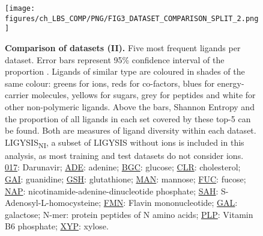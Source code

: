\begin{figure}[ht!]
    \centering
    \texttt{[image: figures/ch\_LBS\_COMP/PNG/FIG3\_DATASET\_COMPARISON\_SPLIT\_2.png]}
    \caption[Comparison of datasets (II)]{\textbf{Comparison of datasets (II).} Five most frequent ligands per dataset. Error bars represent 95\% confidence interval of the proportion \cite{WILSON_197_PROP_CI}. Ligands of similar type are coloured in shades of the same colour: greens for ions, reds for co-factors, blues for energy-carrier molecules, yellows for sugars, grey for peptides and white for other non-polymeric ligands. Above the bars, Shannon Entropy and the proportion of all ligands in each set covered by these top-5 can be found. Both are measures of ligand diversity within each dataset. LIGYSIS\textsubscript{NI}, a subset of LIGYSIS without ions is included in this analysis, as most training and test datasets do not consider ions. \href{https://www.ebi.ac.uk/pdbe-srv/pdbechem/chemicalCompound/show/017}{017}: Darunavir; \href{https://www.ebi.ac.uk/pdbe-srv/pdbechem/chemicalCompound/show/ADE}{ADE}: adenine; \href{https://www.ebi.ac.uk/pdbe-srv/pdbechem/chemicalCompound/show/BGC}{BGC}: glucose; \href{https://www.ebi.ac.uk/pdbe-srv/pdbechem/chemicalCompound/show/CLR}{CLR}: cholesterol; \href{https://www.ebi.ac.uk/pdbe-srv/pdbechem/chemicalCompound/show/GAI}{GAI}: guanidine; \href{https://www.ebi.ac.uk/pdbe-srv/pdbechem/chemicalCompound/show/GSH}{GSH}: glutathione; \href{https://www.ebi.ac.uk/pdbe-srv/pdbechem/chemicalCompound/show/MAN}{MAN}: mannose; \href{https://www.ebi.ac.uk/pdbe-srv/pdbechem/chemicalCompound/show/FUC}{FUC}: fucose; \href{https://www.ebi.ac.uk/pdbe-srv/pdbechem/chemicalCompound/show/NAP}{NAP}: nicotinamide-adenine-dinucleotide phosphate; \href{https://www.ebi.ac.uk/pdbe-srv/pdbechem/chemicalCompound/show/SAH}{SAH}: S-Adenosyl-L-homocysteine; \href{https://www.ebi.ac.uk/pdbe-srv/pdbechem/chemicalCompound/show/FMN}{FMN}: Flavin mononucleotide; \href{https://www.ebi.ac.uk/pdbe-srv/pdbechem/chemicalCompound/show/GAL}{GAL}: galactose; N-mer: protein peptides of N amino acids; \href{https://www.ebi.ac.uk/pdbe-srv/pdbechem/chemicalCompound/show/PLP}{PLP}: Vitamin B6 phosphate; \href{https://www.ebi.ac.uk/pdbe-srv/pdbechem/chemicalCompound/show/XYP}{XYP}: xylose.}
    \label{fig:dataset_comp_2}
\end{figure}

